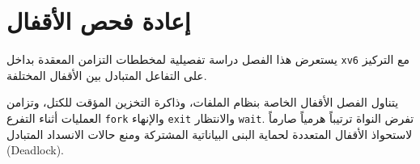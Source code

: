 \chapter{إعادة فحص الأقفال}
\label{chap:lock2}

يستعرض هذا الفصل دراسة تفصيلية لمخططات التزامن المعقدة بداخل \texttt{xv6} مع التركيز على التفاعل المتبادل بين الأقفال المختلفة.

يتناول الفصل الأقفال الخاصة بنظام الملفات، وذاكرة التخزين المؤقت للكتل، وتزامن العمليات أثناء التفرع \texttt{fork} والإنهاء \texttt{exit} والانتظار \texttt{wait}.
تفرض النواة ترتيباً هرمياً صارماً لاستحواذ الأقفال المتعددة لحماية البنى البياناتية المشتركة ومنع حالات الانسداد المتبادل (Deadlock).
